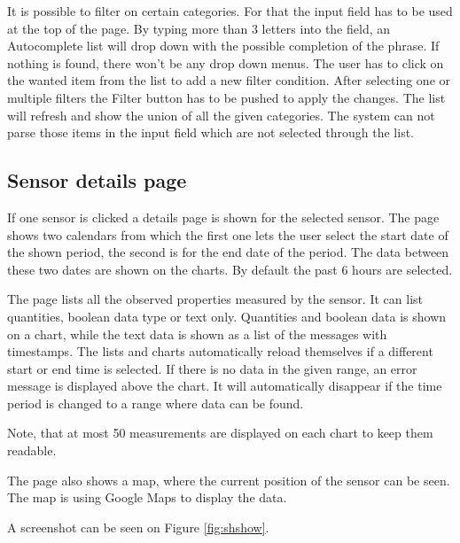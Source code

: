 It is possible to filter on certain categories. For that the input field has to be used at the top of the page. By typing more than 3 letters into the field, an Autocomplete list will drop down with the possible completion of the phrase. If nothing is found, there won't be any drop down menus. The user has to click on the wanted item from the list to add a new filter condition. After selecting one or multiple filters the Filter button has to be pushed to apply the changes. The list will refresh and show the union of all the given categories. The system can not parse those items in the input field which are not selected through the list.  

\subsection{Sensor details page}
If one sensor is clicked a details page is shown for the selected sensor. The  page shows two calendars from which the first one lets the user select the start date of the shown period, the second is for the end date of the period. The data between these two dates are shown on the charts. By default the past 6 hours are selected. 

The page lists all the observed properties measured by the sensor. It can list quantities, boolean data type or text only. Quantities and boolean data is shown on a chart, while the text data is shown as a list of the messages with timestamps. The lists and charts automatically reload themselves if a different start or end time is selected. If there is no data in the given range, an error message is displayed above the chart. It will automatically disappear if the time period is changed to a range where data can be found. 

Note, that at most 50 measurements are  displayed on each chart to keep them readable.

The page also shows a map, where the current position of the sensor can be seen. The map is using Google Maps to display the data.

A screenshot can be seen on Figure \ref{fig:shshow}.


